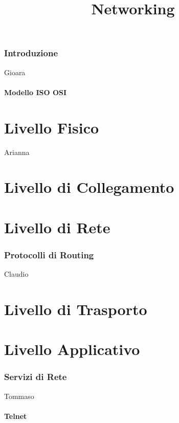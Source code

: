 \documentclass[a4paper,11pt]{paper}
\title{Networking}
\begin{document}
\maketitle
\tableofcontents
\newpage

\section{Introduzione}
Gioara
\subsection{Modello ISO OSI}
\newpage

\part{Livello Fisico}
Arianna
\newpage
\part{Livello di Collegamento}
\newpage
\part{Livello di Rete}
\section{Protocolli di Routing}
Claudio
\part{Livello di Trasporto}
\newpage
\part{Livello Applicativo}
\section{Servizi di Rete}
Tommaso
\subsection{Telnet}
\end{document}
